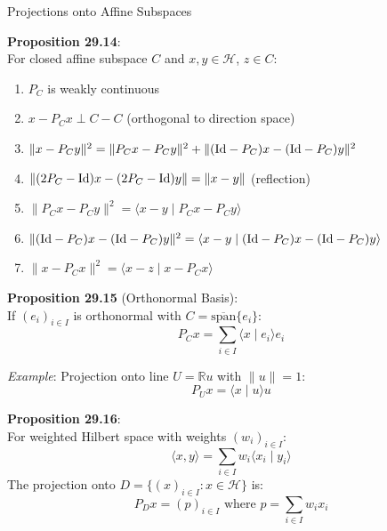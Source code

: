 \documentclass[aspectratio=169,10pt]{beamer}
\begin{document}
\begin{frame}[allowframebreaks]{Projections onto Affine Subspaces}

    \textbf{Proposition 29.14}:\\
    For closed affine subspace $C$ and $x, y \in \mathcal{H}$, $z \in C$:
    \begin{enumerate}
        \item[(i)] $P_C$ is weakly continuous
        \item[(ii)] $x - P_C x \perp C - C$ (orthogonal to direction space)
        \item[(iii)] $\|x - P_C y\|^2 = \|P_C x - P_C y\|^2 + \|({\rm Id} - P_C)x - ({\rm Id} - P_C)y\|^2$
        \item[(iv)] $\|(2P_C - {\rm Id})x - (2P_C - {\rm Id})y\| = \|x - y\|$ (reflection)
        \item[(v)] $\|P_C x - P_C y\|^2 = \langle x - y \mid P_C x - P_C y \rangle$
        \item[(vi)] $\|({\rm Id} - P_C)x - ({\rm Id} - P_C)y\|^2 = \langle x - y \mid ({\rm Id} - P_C)x - ({\rm Id} - P_C)y \rangle$
        \item[(vii)] $\|x - P_C x\|^2 = \langle x - z \mid x - P_C x \rangle$
    \end{enumerate}

    \framebreak

    \textbf{Proposition 29.15} (Orthonormal Basis):\\
    If $(e_i)_{i \in I}$ is orthonormal with $C = \overline{\text{span}} \{e_i\}$:
    $$P_C x = \sum_{i \in I} \langle x \mid e_i \rangle e_i$$

    \textit{Example}: Projection onto line $U = \mathbb{R} u$ with $\|u\| = 1$:
    $$P_U x = \langle x \mid u \rangle u$$

    \vspace{0.5cm}

    \textbf{Proposition 29.16}:\\
    For weighted Hilbert space with weights $(w_i)_{i \in I}$:
    $$\langle x, y \rangle = \sum_{i \in I} w_i \langle x_i \mid y_i \rangle$$
    The projection onto $D = \{(x)_{i \in I} : x \in \mathcal{H}\}$ is:
    $$P_D x = (p)_{i \in I} \text{ where } p = \sum_{i \in I} w_i x_i$$

\end{frame}
\end{document}
